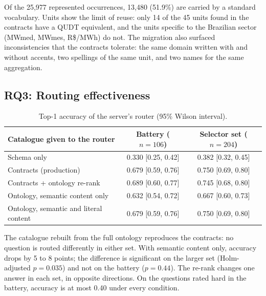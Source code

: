 Of the 25{,}977 represented occurrences, 13{,}480 (51.9\%) are carried by a standard
vocabulary. Units show the limit of reuse: only 14 of the 45 units found in the contracts
have a QUDT equivalent, and the units specific to the Brazilian sector (MWmed, MWmes,
R\$/MWh) do not. The migration also surfaced inconsistencies that the contracts tolerate:
the same domain written with and without accents, two spellings of the same unit, and two
names for the same aggregation.

\subsection{RQ3: Routing effectiveness}
\begin{table}[ht]
\centering\small
\caption{Top-1 accuracy of the server's router (95\% Wilson interval).}
\label{tab:routing}
\begin{tabular}{lcc}
\toprule
Catalogue given to the router & Battery ($n=106$) & Selector set ($n=204$) \\
\midrule
Schema only & 0.330 [0.25, 0.42] & 0.382 [0.32, 0.45] \\
Contracts (production) & 0.679 [0.59, 0.76] & 0.750 [0.69, 0.80] \\
Contracts + ontology re-rank & 0.689 [0.60, 0.77] & 0.745 [0.68, 0.80] \\
Ontology, semantic content only & 0.632 [0.54, 0.72] & 0.667 [0.60, 0.73] \\
Ontology, semantic and literal content & 0.679 [0.59, 0.76] & 0.750 [0.69, 0.80] \\
\bottomrule
\end{tabular}
\end{table}

The catalogue rebuilt from the full ontology reproduces the contracts: no question is routed
differently in either set. With semantic content only, accuracy drops by 5 to 8 points; the
difference is significant on the larger set (Holm-adjusted $p=0.035$) and not on the battery
($p=0.44$). The re-rank changes one answer in each set, in opposite directions. On the
questions rated hard in the battery, accuracy is at most 0.40 under every condition.

